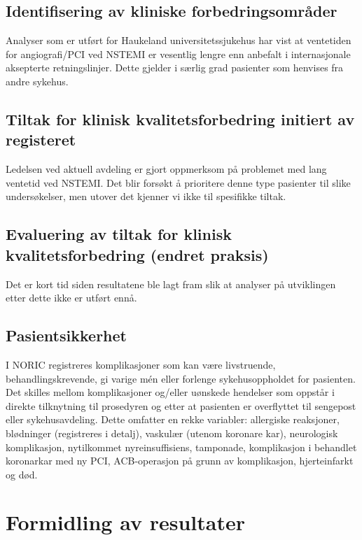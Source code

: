\documentclass[norsk, a4paper]{report}
\begin{document}
\section{Identifisering av kliniske forbedringsområder}\label{sec:ide}
Analyser som er utført for Haukeland universitetssjukehus har vist at ventetiden for angiografi/PCI ved NSTEMI er vesentlig lengre enn anbefalt i internasjonale aksepterte retningslinjer. Dette gjelder i særlig grad pasienter som henvises fra andre sykehus.

\section{Tiltak for klinisk kvalitetsforbedring initiert av registeret}\label{sec:brures}
Ledelsen ved aktuell avdeling er gjort oppmerksom på problemet med lang ventetid ved NSTEMI. Det blir forsøkt å prioritere denne type pasienter til slike undersøkelser, men utover det kjenner vi ikke til spesifikke tiltak.

\section{Evaluering av tiltak for klinisk kvalitetsforbedring (endret praksis)}\label{sec:evakva}
Det er kort tid siden resultatene ble lagt fram slik at analyser på utviklingen etter dette ikke er utført ennå.

\section{Pasientsikkerhet}\label{sec:kom}
I NORIC registreres komplikasjoner som kan være livstruende, behandlingskrevende, gi varige mén eller forlenge sykehusoppholdet for pasienten. Det skilles mellom komplikasjoner og/eller uønskede hendelser som oppstår i direkte tilknytning til prosedyren og etter at pasienten er overflyttet til sengepost eller sykehusavdeling. Dette omfatter en rekke variabler: allergiske reaksjoner, blødninger (registreres i detalj), vaskulær (utenom koronare kar), neurologisk komplikasjon, nytilkommet nyreinsuffisiens, tamponade, komplikasjon i behandlet koronarkar med ny PCI, ACB-operasjon på grunn av komplikasjon, hjerteinfarkt og død.



\chapter{Formidling av resultater}\label{cha:dat}
\end{document}
